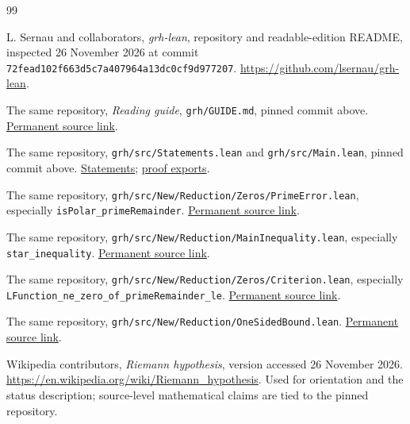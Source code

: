 \begin{thebibliography}{99}
\small
\raggedright
{}
L. Sernau and collaborators, \emph{grh-lean}, repository and readable-edition
README, inspected 26 November 2026 at commit
\nolinkurl{72fead102f663d5c7a407964a13dc0cf9d977207}.
\url{https://github.com/lsernau/grh-lean}.

The same repository, \emph{Reading guide}, \texttt{grh/GUIDE.md}, pinned commit above.
\href{https://github.com/lsernau/grh-lean/blob/72fead102f663d5c7a407964a13dc0cf9d977207/grh/GUIDE.md}{Permanent source link}.

The same repository, \texttt{grh/src/Statements.lean} and
\texttt{grh/src/Main.lean}, pinned commit above.
\href{https://github.com/lsernau/grh-lean/blob/72fead102f663d5c7a407964a13dc0cf9d977207/grh/src/Statements.lean}{Statements};
\href{https://github.com/lsernau/grh-lean/blob/72fead102f663d5c7a407964a13dc0cf9d977207/grh/src/Main.lean}{proof exports}.

The same repository, \nolinkurl{grh/src/New/Reduction/Zeros/PrimeError.lean},
especially \texttt{isPolar\_primeRemainder}.
\href{https://github.com/lsernau/grh-lean/blob/72fead102f663d5c7a407964a13dc0cf9d977207/grh/src/New/Reduction/Zeros/PrimeError.lean}{Permanent source link}.

The same repository, \nolinkurl{grh/src/New/Reduction/MainInequality.lean},
especially \texttt{star\_inequality}.
\href{https://github.com/lsernau/grh-lean/blob/72fead102f663d5c7a407964a13dc0cf9d977207/grh/src/New/Reduction/MainInequality.lean}{Permanent source link}.

The same repository, \nolinkurl{grh/src/New/Reduction/Zeros/Criterion.lean},
especially \texttt{LFunction\_ne\_zero\_of\_primeRemainder\_le}.
\href{https://github.com/lsernau/grh-lean/blob/72fead102f663d5c7a407964a13dc0cf9d977207/grh/src/New/Reduction/Zeros/Criterion.lean}{Permanent source link}.

The same repository, \nolinkurl{grh/src/New/Reduction/OneSidedBound.lean}.
\href{https://github.com/lsernau/grh-lean/blob/72fead102f663d5c7a407964a13dc0cf9d977207/grh/src/New/Reduction/OneSidedBound.lean}{Permanent source link}.

Wikipedia contributors, \emph{Riemann hypothesis}, version accessed
26 November 2026.
\url{https://en.wikipedia.org/wiki/Riemann_hypothesis}.
Used for orientation and the status description; source-level mathematical
claims are tied to the pinned repository.


\end{thebibliography}
